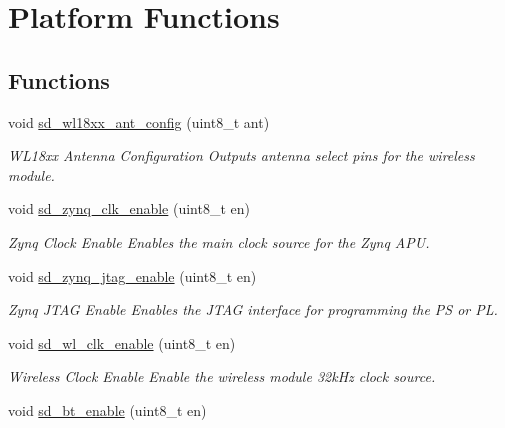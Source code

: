 \hypertarget{group___s_d___platform___function___declarations}{}\section{Platform Functions}
\label{group___s_d___platform___function___declarations}
\subsection*{Functions}
\begin{DoxyCompactItemize}
\item 
void \mbox{\hyperlink{group___s_d___platform___function___declarations_ga3d09a16b4b68ce526bd3eddba77b655c}{sd\+\_\+wl18xx\+\_\+ant\+\_\+config}} (uint8\+\_\+t ant)
\begin{DoxyCompactList}\small\item\em W\+L18xx Antenna Configuration Outputs antenna select pins for the wireless module. \end{DoxyCompactList}\item 
void \mbox{\hyperlink{group___s_d___platform___function___declarations_gaf9291353913fb90687c915313dea1a0c}{sd\+\_\+zynq\+\_\+clk\+\_\+enable}} (uint8\+\_\+t en)
\begin{DoxyCompactList}\small\item\em Zynq Clock Enable Enables the main clock source for the Zynq A\+PU. \end{DoxyCompactList}\item 
void \mbox{\hyperlink{group___s_d___platform___function___declarations_ga028c8d70d36b43a468aafb78c7442eef}{sd\+\_\+zynq\+\_\+jtag\+\_\+enable}} (uint8\+\_\+t en)
\begin{DoxyCompactList}\small\item\em Zynq J\+T\+AG Enable Enables the J\+T\+AG interface for programming the PS or PL. \end{DoxyCompactList}\item 
void \mbox{\hyperlink{group___s_d___platform___function___declarations_ga3a5f60d707cd2405cf9f9a36c69de97d}{sd\+\_\+wl\+\_\+clk\+\_\+enable}} (uint8\+\_\+t en)
\begin{DoxyCompactList}\small\item\em Wireless Clock Enable Enable the wireless module 32k\+Hz clock source. \end{DoxyCompactList}\item 
void \mbox{\hyperlink{group___s_d___platform___function___declarations_ga5901d51fd6320b6f45c3de9e910ef765}{sd\+\_\+bt\+\_\+enable}} (uint8\+\_\+t en)

\end{DoxyCompactItemize}
